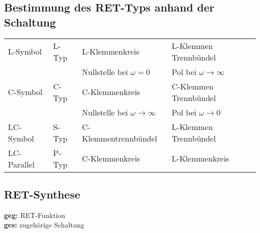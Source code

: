 \subsection{Bestimmung des RET-Typs anhand der Schaltung}
\begin{tabular}{llll}
L-Symbol & L-Typ & L-Klemmenkreis & L-Klemmen Trennbündel\\
& & Nullstelle bei $\omega = 0$ & Pol bei $\omega \rightarrow \infty$ \\
C-Symbol & C-Typ & C-Klemmenkreis & C-Klemmen Trennbündel\\
& & Nullstelle bei $\omega \rightarrow \infty$ & Pol bei $\omega \rightarrow
0$\\
LC-Symbol & S-Typ & C-Klemmentrennbündel & L-Klemmen Trennbündel\\
LC-Parallel & P-Typ & C-Klemmenkreis & L-Klemmenkreis\\
\end{tabular}

\subsection{RET-Synthese}
\textbf{geg:} RET-Funktion\\
\textbf{ges:} zugehörige Schaltung\\
